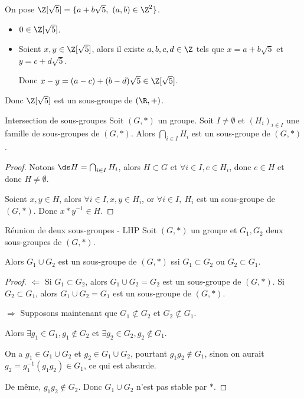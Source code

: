 \begin{exemple}
    On pose $\Z[\sqrt 5] = \{a + b \sqrt 5,~ (a,b) \in \Z^2\}$.
    \begin{itemize}
        \item $0 \in \Z[\sqrt 5]$.
        \item Soient $x,y \in \Z[\sqrt 5]$, alors il existe $a,b,c,d \in \Z$ tels que
        $x = a + b \sqrt 5$ et $y = c + d \sqrt 5$.

        Donc $x - y = (a - c) + (b - d) \sqrt 5 \in \Z[\sqrt 5]$.
    \end{itemize}

    Donc $\Z[\sqrt 5]$ est un sous-groupe de $(\R,+)$.
\end{exemple}

\begin{theoreme}{Intersection de sous-groupes}{}
    Soit $(G, \ast)$ un groupe. Soit $I \neq \emptyset$ et 
    $(H_i)_{i \in I}$ une famille de sous-groupes de $(G, \ast)$.
    Alors $\displaystyle \bigcap_{i \in I} H_i$ est un sous-groupe de $(G, \ast)$.
\end{theoreme}

\begin{proof}
    Notons $\ds H = \bigcap_{i \in I} H_i$, alors $H \subset G$ 
    et $\forall i \in I, e \in H_i$, donc $e \in H$ et donc $H \neq \emptyset$.

    Soient $x, y \in H$, alors $\forall i \in I, x, y \in H_i$, or 
    $\forall i \in I,~H_i$ est un sous-groupe de $(G, \ast)$.
    Donc $x \ast y^{-1} \in H$.
\end{proof}

\begin{proposition}{Réunion de deux sous-groupes - LHP}{}
    Soit $(G, \ast)$ un groupe et $G_1, G_2$ deux sous-groupes de $(G, \ast)$.

    Alors $G_1 \cup G_2$ est un sous-groupe de $(G, \ast)$ ssi $G_1 \subset G_2$ ou $G_2 \subset G_1$.
\end{proposition}

\begin{proof}
    $\Leftarrow$ Si $G_1 \subset G_2$, alors $G_1 \cup G_2 = G_2$ est un sous-groupe de $(G, \ast)$.
    Si $G_2 \subset G_1$, alors $G_1 \cup G_2 = G_1$ est un sous-groupe de $(G, \ast)$.

    \avspace $\Rightarrow$ Supposons maintenant que $G_1 \not \subset G_2$ et $G_2 \not \subset G_1$.

    Alors $\exists g_1 \in G_1, g_1 \not \in G_2$ et $\exists g_2 \in G_2, g_2 \not \in G_1$.

    On a $g_1 \in G_1 \cup G_2$ et $g_2 \in G_1 \cup G_2$, pourtant $g_1 g_2 \not \in G_1$, 
    sinon on aurait $g_2 = g_1^{-1} (g_1 g_2) \in G_1$, ce qui est absurde.

    De même, $g_1 g_2 \not \in G_2$.
    Donc $G_1 \cup G_2$ n'est pas stable par $\ast$. 
\end{proof}

